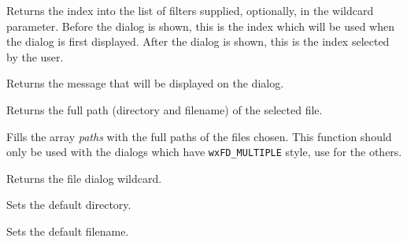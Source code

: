 \label{wxfiledialoggetfilterindex}


Returns the index into the list of filters supplied, optionally, in the wildcard parameter.
Before the dialog is shown, this is the index which will be used when the dialog is first displayed.
After the dialog is shown, this is the index selected by the user.

\label{wxfiledialoggetmessage}


Returns the message that will be displayed on the dialog.

\label{wxfiledialoggetpath}


Returns the full path (directory and filename) of the selected file.

\label{wxfiledialoggetpaths}


Fills the array {\it paths} with the full paths of the files chosen. This
function should only be used with the dialogs which have {\tt wxFD\_MULTIPLE} style,
use  for the others.

\label{wxfiledialoggetwildcard}


Returns the file dialog wildcard.

\label{wxfiledialogsetdirectory}


Sets the default directory.

\label{wxfiledialogsetfilename}


Sets the default filename.

\label{wxfiledialogsetfilterindex}



